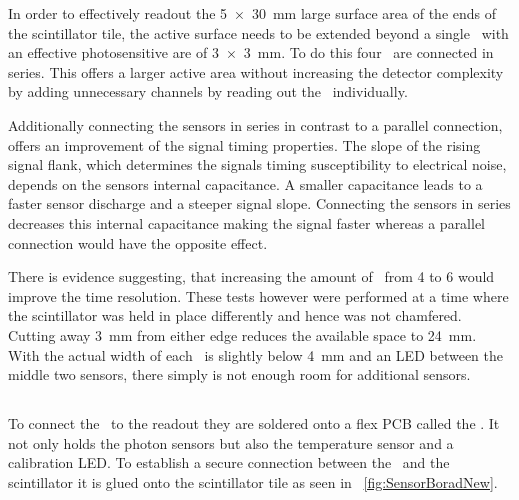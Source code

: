 \documentclass[../BTOF_summary.tex]{subfiles}
\begin{document}
In order to effectively readout the \SI{5x30}{mm} large surface area of the ends of the scintillator tile, the active surface needs to be extended beyond a single \sipm\ with an effective photosensitive are of \SI{3x3}{mm}.
To do this four \sipms\ are connected in series.
This offers a larger active area without increasing the detector complexity by adding unnecessary channels by reading out the \sipms\ individually.

Additionally connecting the sensors in series in contrast to a parallel connection, offers an improvement of the signal timing properties.
The slope of the rising signal flank, which determines the signals timing susceptibility to electrical noise, depends on the sensors internal capacitance.
A smaller capacitance leads to a faster sensor discharge and a steeper signal slope.
Connecting the sensors in series decreases this internal capacitance making the signal faster whereas a parallel connection would have the opposite effect.

There is evidence suggesting, that increasing the amount of \sipms\ from 4 to 6 would improve the time resolution.
These tests however were performed at a time where the scintillator was held in place differently and hence was not chamfered.
Cutting away \SI{3}{mm} from either edge reduces the available space to \SI{24}{mm}.
With the actual width of each \sipm\ is slightly below \SI{4}{mm} and an LED between the middle two sensors, there simply is not enough room for additional sensors.

\subsection{\sensorboard}

To connect the \sipms\ to the readout they are soldered onto a flex PCB called the \sensorboard .
It not only holds the photon sensors but also the temperature sensor and a calibration LED.
To establish a secure connection between the \sipms\ and the scintillator it is glued onto the scintillator tile as seen in \fig~\ref{fig:SensorBoradNew}.
\end{document}

